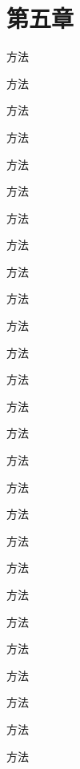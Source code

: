 \chapter{第五章}
%

方法\cite{DBLP:journals/ijmir/ZhuJCGL23}


方法\cite{DBLP:journals/mta/KhanJKSHKA24}


方法\cite{陆启迪2023基于实时视频感知的虚拟体育交互系统}


方法\cite{毕春艳2023基于深度学习的视频人体动作识别综述}


方法\cite{DBLP:conf/iccv/TranBFTP15}



方法\cite{DBLP:conf/cvpr/CarreiraZ17}


方法\cite{DBLP:conf/cvpr/HaraKS18}


方法\cite{DBLP:conf/iclr/DosovitskiyB0WZ21}


方法\cite{DBLP:conf/iccv/Arnab0H0LS21}


方法\cite{DBLP:conf/icml/BertasiusWT21}


方法\cite{DBLP:conf/iccv/PengHGXWJY21}


方法\cite{田永林2022视觉}


方法\cite{DBLP:journals/corr/HintonVD15}


方法\cite{DBLP:journals/corr/abs-2203-06760}


方法\cite{DBLP:conf/cvpr/HeZRS16}


方法\cite{张洋:165}
    

方法\cite{JSGG20230821003}


方法\cite{lifuzzysegnet}


方法\cite{DBLP:conf/mm/HuJG22}



方法\cite{DBLP:conf/cvpr/WangKSL11}



方法\cite{DBLP:conf/iccv/WangS13a}



方法\cite{DBLP:conf/nips/SimonyanZ14}



方法\cite{DBLP:conf/eccv/WangXW0LTG16}



方法\cite{DBLP:conf/cvpr/TranWTRLP18}



方法\cite{DBLP:conf/iccv/LinGH19}


方法\cite{DBLP:conf/nips/VaswaniSPUJGKP17}


方法\cite{DBLP:conf/iclr/DosovitskiyB0WZ21}



